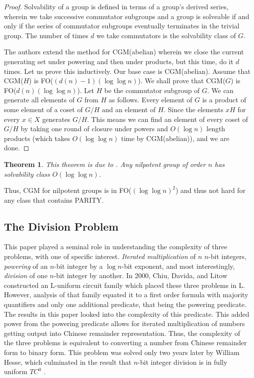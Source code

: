 \documentclass[a4paper,12pt]{article}
\theoremstyle{plain}
\newtheorem{theorem}{Theorem}
\theoremstyle{definition}
\theoremstyle{remark}
\begin{document}
\begin{proof}
  Solvability of a group is defined in terms of a group's derived series, wherein we take successive commutator subgroups and a group is solveable if and only if the series of commutator subgroups eventually terminates in the trivial group. The number of times $d$ we take commutators is the solvability class of $G$. \vspace{\baselineskip}

  The authors extend the method for CGM(abelian) wherein we close the current generating set under powering and then under products, but this time, do it $d$ times. Let us prove this inductively. Our base case is CGM(abelian). Assume that CGM($H$) is FO($(d(n)-1)(\log\log n)$). We shall prove that CGM($G$) is FO($d(n)(\log\log n)$). Let $H$ be the commutator subgroup of $G$. We can generate all elements of $G$ from $H$ as follows. Every element of $G$ is a product of some element of a coset of $G/H$ and an element of $H$. Since the elements $xH$ for every $x\in X$ generates $G/H$. This means we can find an element of every coset of $G/H$ by taking one round of closure under powers and $O(\log n)$ length products (which takes $O(\log\log n)$ time by CGM(abelian)), and we are done.
\end{proof}
\begin{theorem}
  This theorem is due to \cite{therien1980classification}. Any nilpotent group of order $n$ has solvability class $O(\log\log n)$.
\end{theorem}
Thus, CGM for nilpotent groups is in FO($(\log\log n)^2$) and thus not hard for any class that contains PARITY.

\subsection{The Division Problem}
This paper played a seminal role in understanding the complexity of three problems, with one of specific interest. \textit{Iterated multiplication} of $n$ $n$-bit integers, \textit{powering} of an $n$-bit integer by a $\log n$-bit exponent, and most interestingly, \textit{division} of one $n$-bit integer by another.
In 2000, Chiu, Davida, and Litow \cite{Chiu2001} constructed an L-uniform circuit family which placed these three problems in L. However, analysis of that family equated it to a first order formula with majority quantifiers and only one additional predicate, that being the powering predicate. The results in this paper looked into the complexity of this predicate. This added power from the powering predicate allows for iterated multiplication of numbers getting output into Chinese remainder representation. Thus, the complexity of the three problems is equivalent to converting a number from Chinese remainder form to binary form. This problem was solved only two years later by William Hesse, which culminated in the result that $n$-bit integer division is in fully uniform $TC^0$ \cite{Hesse2002}.
\end{document}
